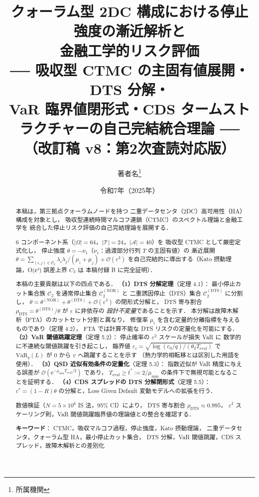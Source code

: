 \documentclass[12pt,a4paper]{article}
\title{%
  \textbf{クォーラム型 2DC 構成における停止強度の漸近解析と\\
  金融工学的リスク評価}\\[0.5em]
  \large
  ── 吸収型 CTMC の主固有値展開・DTS 分解・\\
  VaR 臨界値閉形式・CDS タームストラクチャーの自己完結統合理論 ──\\[0.3em]
  \small（改訂稿 v8：第2次査読対応版）
}
\author{著者名\thanks{所属機関}}
\date{令和7年（2025年）}
\theoremstyle{plain}
\theoremstyle{definition}
\theoremstyle{remark}
\newcommand{\calO}{\mathcal{O}}
\newcommand{\calA}{\mathcal{A}}
\newcommand{\calT}{\mathcal{T}}
\newcommand{\eps}{\varepsilon}
\newcommand{\e}{\mathrm{e}}
\newcommand{\VaR}{\mathrm{VaR}}
\newcommand{\calCtwo}{\mathcal{C}_2}
\newcommand{\calCNOR}{\calCtwo^{(\mathrm{NOR})}}
\newcommand{\calCDTS}{\calCtwo^{(\mathrm{DTS})}}
\newcommand{\thetaNOR}{\theta^{(\mathrm{NOR})}}
\newcommand{\thetaDTS}{\theta^{(\mathrm{DTS})}}
\newcommand{\rhoDTS}{\rho_{\mathrm{DTS}}}
\newcommand{\Teval}{T_{\mathrm{eval}}}
\begin{document}
\maketitle\thispagestyle{empty}

\begin{abstract}
本稿は，第三拠点クォーラムノードを持つ
二重データセンタ（2DC）高可用性（HA）構成を対象とし，
吸収型連続時間マルコフ連鎖（CTMC）のスペクトル理論と金融工学を
統合した停止リスク評価の自己完結理論を展開する．

6 コンポーネント系（$|\Omega|=64$，$|\calT|=24$，$|\calA|=40$）を
吸収型 CTMC として厳密定式化し，
停止強度 $\theta = -\nu_1$（$\nu_1$：過渡部分行列 $T$ の主固有値）の
漸近展開 $\theta = \sum_{(i,j)\in\calCtwo}\lambda_i\lambda_j/(\mu_i+\mu_j)+\calO(\eps^3)$
を自己完結的に導出する（Kato 摂動理論，O(ε³) 誤差上界 $C_3$ は
本稿付録 B に完全証明）．

本稿の主要貢献は以下の四点である．
\textbf{（1）DTS 分解定理}（定理 4.1）：
最小停止カット集合族 $\calCtwo$ を通常停止集合 $\calCNOR$ と
二重誘因停止（DTS）集合 $\calCDTS$ に分割し，
$\theta = \thetaNOR + \thetaDTS + \calO(\eps^3)$ の閉形式分解と，
DTS 寄与割合 $\rhoDTS = \thetaDTS/\theta$ が $\eps$ に非依存の
\emph{設計不変量}であることを示す．
本分解は故障木解析（FTA）のカットセット分割と異なり，
修復率 $\mu_i$ を含む定量的分離指標を与えるものであり（定理 4.2），
FTA では計算不能な DTS リスクの定量化を可能にする．
\textbf{（2）VaR 閾値跳躍定理}（定理 5.2）：
停止確率の $\eps^2$ スケールが損失 VaR に
数学的に不連続な閾値跳躍を引き起こし，
臨界値 $\eps_c = \sqrt{\log(c_0/q)/(\theta_2\Teval)}$ で
$\VaR_q(L)$ が $0$ から $v$ へ跳躍することを示す
（熱力学的相転移とは区別した用語を使用）．
\textbf{（3）QSD 近似有効条件の定量化}（定理 5.3）：
指数近似が VaR 精度に与える誤差が $\calO(\e^{-\mu_{\min}\Teval/2})$ であり，
$\Teval \ge t^* := 2/\mu_{\min}$ の条件下で無視可能となることを証明する．
\textbf{（4）CDS スプレッドの DTS 分解閉形式}（定理 5.5）：
$c^* = (1-R)\theta$ の分解と，Loss Given Default 変動モデルへの拡張を行う．

数値検証（$N=5\times10^6$ IS 法，95\% CI）により，
DTS 寄与割合 $\rhoDTS \approx 0.995$，
$\eps^2$ スケーリング則，VaR 閾値跳躍臨界値の理論値との整合を確認する．

\medskip
\noindent\textbf{キーワード}：
CTMC，吸収マルコフ過程，停止強度，Kato 摂動理論，
二重データセンタ，クォーラム型 HA，最小停止カット集合，
DTS 分解，VaR 閾値跳躍，CDS スプレッド，故障木解析との差別化
\end{abstract}
\end{document}
